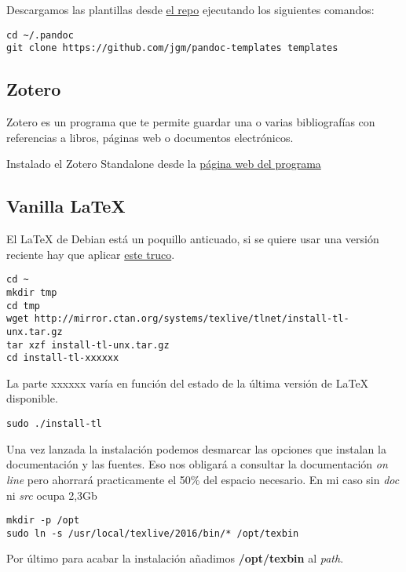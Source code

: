\documentclass[12pt,spanish,]{article}
\begin{document}
Descargamos las plantillas desde
\href{https://github.com/jgm/pandoc-templates}{el repo} ejecutando los
siguientes comandos:

\begin{verbatim}
cd ~/.pandoc
git clone https://github.com/jgm/pandoc-templates templates
\end{verbatim}

\subsection{Zotero}\label{zotero}

Zotero es un programa que te permite guardar una o varias bibliografías
con referencias a libros, páginas web o documentos electrónicos.

Instalado el Zotero Standalone desde la
\href{https://www.zotero.org/}{página web del programa}

\subsection{Vanilla LaTeX}\label{vanilla-latex}

El LaTeX de Debian está un poquillo anticuado, si se quiere usar una
versión reciente hay que aplicar
\href{http://tex.stackexchange.com/questions/1092/how-to-install-vanilla-texlive-on-debian-or-ubuntu}{este
truco}.

\begin{verbatim}
cd ~
mkdir tmp
cd tmp
wget http://mirror.ctan.org/systems/texlive/tlnet/install-tl-unx.tar.gz
tar xzf install-tl-unx.tar.gz
cd install-tl-xxxxxx
\end{verbatim}

La parte xxxxxx varía en función del estado de la última versión de
LaTeX disponible.

\begin{verbatim}
sudo ./install-tl
\end{verbatim}

Una vez lanzada la instalación podemos desmarcar las opciones que
instalan la documentación y las fuentes. Eso nos obligará a consultar la
documentación \emph{on line} pero ahorrará practicamente el 50\% del
espacio necesario. En mi caso sin \emph{doc} ni \emph{src} ocupa 2,3Gb

\begin{verbatim}
mkdir -p /opt
sudo ln -s /usr/local/texlive/2016/bin/* /opt/texbin
\end{verbatim}

Por último para acabar la instalación añadimos \textbf{/opt/texbin} al
\emph{path}.
\end{document}
